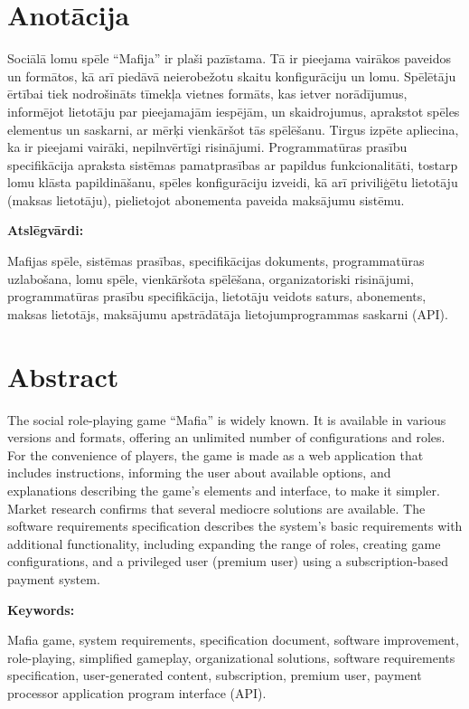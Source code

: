 \section*{Anotācija}
\setcounter{page}{2}
Sociālā lomu spēle ``Mafija'' ir plaši pazīstama. Tā ir pieejama vairākos
paveidos un formātos, kā arī piedāvā neierobežotu skaitu konfigurāciju un lomu.
Spēlētāju ērtībai tiek nodrošināts tīmekļa vietnes formāts, kas ietver
norādījumus, informējot lietotāju par pieejamajām iespējām, un skaidrojumus,
aprakstot spēles elementus un saskarni, ar mērķi vienkāršot tās spēlēšanu.
Tirgus izpēte apliecina, ka ir pieejami vairāki, nepilnvērtīgi risinājumi.
Programmatūras prasību specifikācija apraksta sistēmas pamatprasības ar
papildus funkcionalitāti, tostarp lomu klāsta papildināšanu, spēles
konfigurāciju izveidi, kā arī priviliģētu lietotāju (maksas lietotāju),
pielietojot abonementa paveida maksājumu sistēmu.

\textbf{Atslēgvārdi:}

Mafijas spēle, sistēmas prasības, specifikācijas dokuments, programmatūras
uzlabošana, lomu spēle, vienkāršota spēlēšana, organizatoriski risinājumi,
programmatūras prasību specifikācija, lietotāju veidots saturs, abonements,
maksas lietotājs, maksājumu apstrādātāja lietojumprogrammas saskarni (API).

\section*{Abstract}
The social role-playing game ``Mafia'' is widely known. It is available in
various versions and formats, offering an unlimited number of configurations
and roles. For the convenience of players, the game is made as a web
application that includes instructions, informing the user about available
options, and explanations describing the game's elements and interface, to make
it simpler. Market research confirms that several mediocre solutions are
available. The software requirements specification describes the system's basic
requirements with additional functionality, including expanding the range of
roles, creating game configurations, and a privileged user (premium user) using
a subscription-based payment system.

\textbf{Keywords:}

Mafia game, system requirements, specification document, software improvement,
role-playing, simplified gameplay, organizational solutions, software
requirements specification, user-generated content, subscription, premium user,
payment processor application program interface (API).
